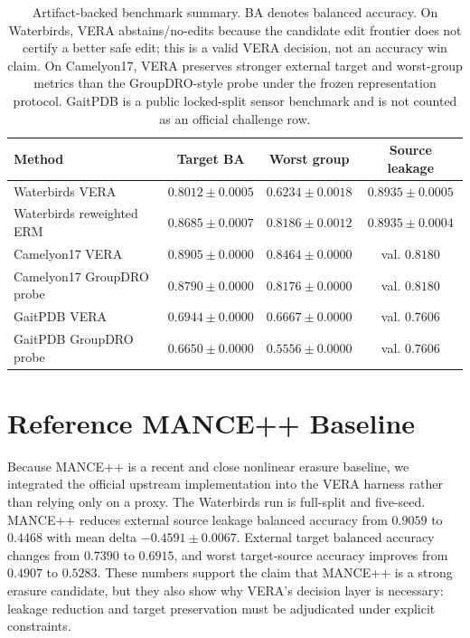 \documentclass[10pt]{article}
\begin{document}
\begin{table}[t]
\centering
\small
\begin{tabular}{@{}lccc@{}}
\toprule
Method & Target BA & Worst group & Source leakage \\
\midrule
Waterbirds VERA & $0.8012 \pm 0.0005$ & $0.6234 \pm 0.0018$ & $0.8935 \pm 0.0005$ \\
Waterbirds reweighted ERM & $0.8685 \pm 0.0007$ & $0.8186 \pm 0.0012$ & $0.8935 \pm 0.0004$ \\
Camelyon17 VERA & $0.8905 \pm 0.0000$ & $0.8464 \pm 0.0000$ & val. $0.8180$ \\
Camelyon17 GroupDRO probe & $0.8790 \pm 0.0000$ & $0.8176 \pm 0.0000$ & val. $0.8180$ \\
GaitPDB VERA & $0.6944 \pm 0.0000$ & $0.6667 \pm 0.0000$ & val. $0.7606$ \\
GaitPDB GroupDRO probe & $0.6650 \pm 0.0000$ & $0.5556 \pm 0.0000$ & val. $0.7606$ \\
\bottomrule
\end{tabular}
\caption{Artifact-backed benchmark summary. BA denotes balanced accuracy. On
Waterbirds, VERA abstains/no-edits because the candidate edit frontier does not
certify a better safe edit; this is a valid VERA decision, not an accuracy win
claim. On Camelyon17, VERA preserves stronger external target and worst-group
metrics than the GroupDRO-style probe under the frozen representation protocol.
GaitPDB is a public locked-split sensor benchmark and is not counted as an
official challenge row.}
\label{tab:benchmarks}
\end{table}

\section{Reference MANCE++ Baseline}

Because MANCE++ is a recent and close nonlinear erasure baseline, we integrated
the official upstream implementation into the VERA harness rather than relying
only on a proxy. The Waterbirds run is full-split and five-seed. MANCE++ reduces
external source leakage balanced accuracy from $0.9059$ to $0.4468$ with mean
delta $-0.4591 \pm 0.0067$. External target balanced accuracy changes from
$0.7390$ to $0.6915$, and worst target-source accuracy improves from $0.4907$
to $0.5283$. These numbers support the claim that MANCE++ is a strong erasure
candidate, but they also show why VERA's decision layer is necessary: leakage
reduction and target preservation must be adjudicated under explicit
constraints.
\end{document}
